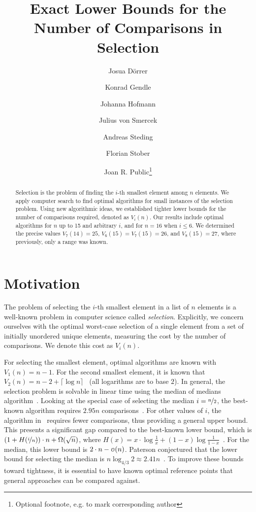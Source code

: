 \documentclass[a4paper,UKenglish,cleveref, autoref, thm-restate]{lipics-v2021}
\title{\Large Exact Lower Bounds for the Number of Comparisons in Selection}
\author{Josua Dörrer}{University Stuttgart}{}{}{}
\author{Konrad Gendle}{University Stuttgart}{}{}{}
\author{Johanna Hofmann}{University Stuttgart}{}{}{}
\author{Julius von Smercek}{University Stuttgart}{}{}{}
\author{Andreas Steding}{University Stuttgart}{}{}{}
\author{Florian Stober}{University Stuttgart}{}{}{}
\author{Joan R. Public\footnote{Optional footnote, e.g. to mark corresponding author}}{Department of Informatics, Dummy College, [optional: Address], Country}{joanrpublic@dummycollege.org}{[orcid]}{[funding]}
\newcommand\smallO{
\mathchoice
{{\scriptstyle\mathcal{O}}}%
{{\scriptstyle\mathcal{O}}}%
{{\scriptscriptstyle\mathcal{O}}}%
{\scalebox{.50}{$\scriptscriptstyle\mathcal{O}$}}%
}
\begin{document}
\maketitle

\begin{abstract} \small\baselineskip=9pt
  Selection is the problem of finding the $i$-th smallest element among $n$ elements.
  We apply computer search to find optimal algorithms for small instances of the selection problem.
  Using new algorithmic ideas, we established tighter lower bounds for the number of comparisons required, denoted as $V_i(n)$.
  Our results include optimal algorithms for $n$ up to 15 and arbitrary $i$, and for $n=16$ when $i \leq 6$.
  We determined the precise values $V_7(14) = 25$, $V_6(15) = V_7(15) = 26$, and $V_8(15) = 27$, where previously, only a range was known.

\end{abstract} %

\section{Motivation} \label{sec:motivation}

The problem of selecting the $i$-th smallest element in a list of $n$ elements is a well-known problem in computer science called \textit{selection}.
Explicitly, we concern ourselves with the optimal worst-case selection of a single element from a set of initially unordered unique elements, measuring the cost by the number of comparisons.
We denote this cost as $V_i(n)$.

For selecting the smallest element, optimal algorithms are known with $V_1(n) = n - 1$.
For the second smallest element, it is known that $V_2(n) = n - 2 + \lceil \log n\rceil$~\cite{Knuth1973} (all logarithms are to base $2$).
In general, the selection problem is solvable in linear time using the median of medians algorithm~\cite{Blum1972}.
Looking at the special case of selecting the median $i = \nicefrac{n}{2}$, the best-known algorithm requires $2.95n$ comparisons~\cite{dor1999selecting}.
For other values of $i$, the algorithm in~\cite{dor1999selecting} requires fewer comparisons, thus providing a general upper bound.
This presents a significant gap compared to the best-known lower bound, which is $\left (1 + H(\nicefrac{i}{n}) \right ) \cdot n + \Omega(\sqrt n)$, where $H(x) = x \cdot \log \frac{1}{x} + (1 - x) \log \frac{1}{1 - x}$~\cite{bent1985finding}.
For the median, this lower bound is $2 \cdot n - \smallO(n)$.
Paterson conjectured that the lower bound for selecting the median is $n \log_{4/3} 2 \approx 2.41n$~\cite{paterson1996progress}.
To improve these bounds toward tightness, it is essential to have known optimal reference points that general approaches can be compared against.
\end{document}
